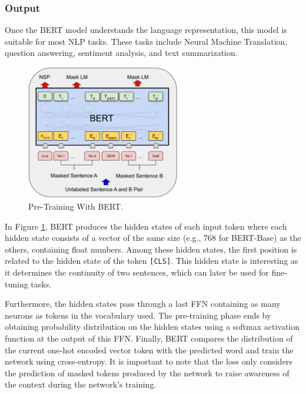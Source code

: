 \subsubsection{Output}
\label{subsubsec:output}

Once the BERT model understands the language representation, this model is
suitable for most NLP tasks. These tasks include Neural Machine Translation,
question answering, sentiment analysis, and text summarization.
\begin{figure}[!ht]
  \centering
  \includegraphics[width=0.6\textwidth]{img/embedders/bert/pre-training}
  \caption{Pre-Training With BERT.}
  \label{fig:pre-training}
\end{figure}

In Figure \ref{fig:pre-training}, BERT produces the hidden states of each input
token where each hidden state consists of a vector of the same size (e.g., 768
for BERT-Base) as the others, containing float numbers.  Among these hidden
states, the first position is related to the hidden state of the token
\texttt{[CLS]}. This hidden state is interesting as it determines the continuity
of two sentences, which can later be used for fine-tuning tasks.

Furthermore, the hidden states pass through a last FFN containing as many
neurons as tokens in the vocabulary used. The pre-training phase ends by
obtaining probability distribution on the hidden states using a softmax
activation function at the output of this FFN. Finally, BERT compares the
distribution of the current one-hot encoded vector token with the predicted word
and train the network using cross-entropy. It is important to note that the loss
only considers the prediction of masked tokens produced by the network to raise
awareness of the context during the network's training.

